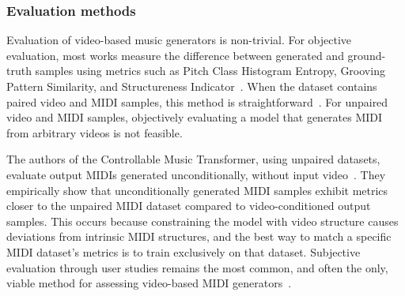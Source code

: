 \subsubsection{Evaluation methods}
\label{sec:related_eval}

Evaluation of video-based music generators is non-trivial. For objective evaluation, most works measure the difference between generated and ground-truth samples using metrics such as Pitch Class Histogram Entropy, Grooving Pattern Similarity, and Structureness Indicator~\cite{metrics}.
When the dataset contains paired video and MIDI samples, this method is straightforward~\cite{foley,zhuo}. For unpaired video and MIDI samples, objectively evaluating a model that generates MIDI from arbitrary videos is not feasible. 

The authors of the Controllable Music Transformer, using unpaired datasets, evaluate output MIDIs generated unconditionally, without input video~\cite{di}. 
They empirically show that unconditionally generated MIDI samples exhibit metrics closer to the unpaired MIDI dataset compared to video-conditioned output samples. This occurs because constraining the model with video structure causes deviations from intrinsic MIDI structures, and the best way to match a specific MIDI dataset’s metrics is to train exclusively on that dataset.
Subjective evaluation through user studies remains the most common, and often the only, viable method for assessing video-based MIDI generators~\cite{di,kang,zhuo,foley,rhythmicnet}.